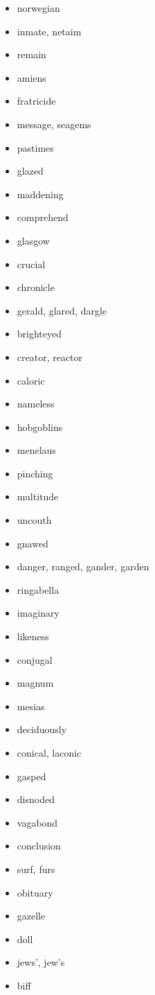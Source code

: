 \documentclass{article}
\begin{document}
\begin{itemize}
    \item norwegian
    \item inmate, netaim
    \item remain
    \item amiens
    \item fratricide
    \item message, seagems
    \item pastimes
    \item glazed
    \item maddening
    \item comprehend
    \item glasgow
    \item crucial
    \item chronicle
    \item gerald, glared, dargle
    \item brighteyed
    \item creator, reactor
    \item caloric
    \item nameless
    \item hobgoblins
    \item menelaus
    \item pinching
    \item multitude
    \item uncouth
    \item gnawed
    \item danger, ranged, gander, garden
    \item ringabella
    \item imaginary
    \item likeness
    \item conjugal
    \item magnum
    \item mesias
    \item deciduously
    \item conical, laconic
    \item gasped
    \item disnoded
    \item vagabond
    \item conclusion
    \item surf, furs
    \item obituary
    \item gazelle
    \item doll
    \item jews', jew's
    \item biff

\end{itemize}
\end{document}
